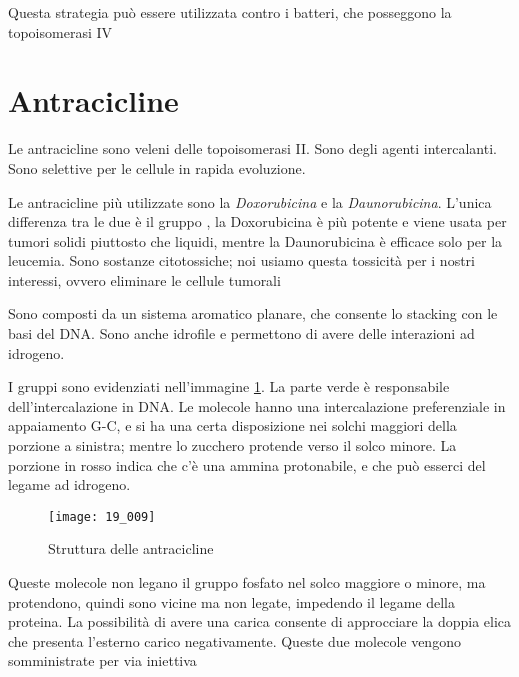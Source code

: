Questa strategia può essere utilizzata contro i batteri, che posseggono
la topoisomerasi IV


\clearpage

\section{Antracicline}

Le antracicline sono veleni delle topoisomerasi II. Sono degli agenti intercalanti. Sono
selettive per le cellule in rapida evoluzione.

Le antracicline più utilizzate sono la \emph{Doxorubicina} e la \emph{Daunorubicina}. L'unica
differenza tra le due è il gruppo , la Doxorubicina è più potente e viene
usata per tumori solidi piuttosto che liquidi, mentre la Daunorubicina è
efficace solo per la leucemia.
Sono sostanze citotossiche; noi usiamo questa tossicità per i nostri
interessi, ovvero eliminare le cellule tumorali

Sono composti da un sistema aromatico planare, che consente lo stacking
con le basi del DNA. Sono anche idrofile e permettono di avere delle
interazioni ad idrogeno.


I gruppi sono evidenziati nell'immagine \ref{fig:Antra}. La parte verde è responsabile
dell'intercalazione in DNA. Le molecole hanno una intercalazione
preferenziale in appaiamento G-C, e si ha una certa disposizione nei
solchi maggiori della porzione a sinistra; mentre lo zucchero protende
verso il solco minore.
La porzione in rosso indica che c'è una ammina protonabile, e che può
esserci del legame ad idrogeno.

\begin{figure}[H]
  \centering
  \texttt{[image: 19\_009]}
  \caption{Struttura delle antracicline}
  \label{fig:Antra}
\end{figure}

Queste molecole non legano il gruppo fosfato nel solco maggiore o
minore, ma protendono, quindi sono vicine ma non legate, impedendo il
legame della proteina. La possibilità di avere una carica consente di
approcciare la doppia elica che presenta l'esterno carico negativamente.
Queste due molecole vengono somministrate per via iniettiva


